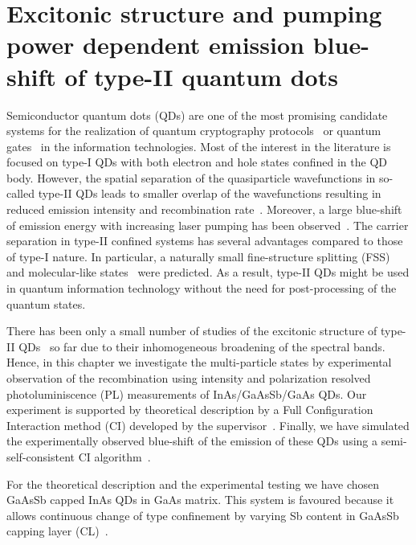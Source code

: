 
\chapter{Excitonic structure and pumping power dependent emission blue-shift of type-II quantum dots}
\label{chap:SciRep}


Semiconductor quantum dots (QDs) are one of the most promising candidate systems for the realization of quantum cryptography protocols~\citep{Muller2014,Strauf2007} or quantum gates~\citep{Stevenson2006,Rodt} in the information technologies. Most of the interest in the literature is focused on type-I QDs with both electron and hole states confined in the QD body. 
However, the spatial separation of the quasiparticle wavefunctions in so-called type-II QDs leads to smaller overlap of the wavefunctions resulting in reduced emission intensity and recombination rate~\citep{Klenovsky10,KleJOPCS,Hsu,Nishikawa2012}. Moreover, a large blue-shift of emission energy with increasing laser pumping has been observed~\citep{Jin,UlloaHomogSRL}. The carrier separation in type-II confined systems has several advantages compared to those of type-I nature. In particular, a naturally small fine-structure splitting (FSS)~\citep{Krapek2015} and molecular-like states~\citep{Klenovsky10,KleJOPCS,KrapekNottingham} were predicted. As a result, type-II QDs might be used in quantum information technology without the need for post-processing of the quantum states. 

There has been only a small number of studies of the excitonic structure of type-II QDs~\citep{Matsuda2007,Miloszewski2014} so far due to their inhomogeneous broadening of the spectral bands. Hence, in this chapter we investigate the multi-particle states by experimental observation of the recombination using intensity and polarization resolved photoluminiscence (PL) measurements of InAs/GaAsSb/GaAs QDs. Our experiment is supported by theoretical description by a Full Configuration Interaction method (CI) developed by the supervisor~\citep{Klenovsky2017}. Finally, we have simulated the experimentally observed blue-shift of the emission of these QDs using a semi-self-consistent CI algorithm~\citep{Klenovsky2017}.

\medskip
For the theoretical description and the experimental testing we have chosen GaAsSb capped InAs QDs in GaAs matrix. This system is favoured because it allows continuous change of type confinement by varying Sb content in GaAsSb capping layer (CL)~\citep{Klenovsky10}.

